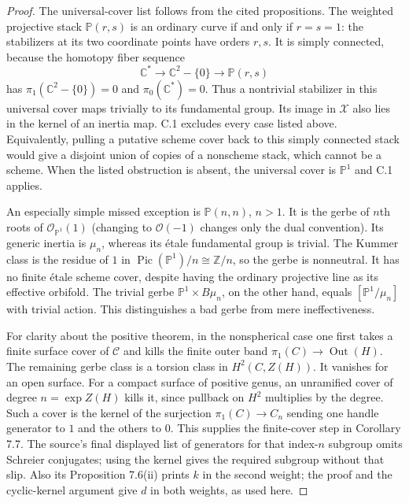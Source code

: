 \begin{proof}
The universal-cover list follows from the cited propositions.
The weighted projective stack $\mathbb P(r,s)$ is an ordinary
curve if and only if $r=s=1$: the stabilizers at its two coordinate
points have orders $r,s$. It is simply connected, because the
homotopy fiber sequence
\[
 \mathbb C^*\longrightarrow\mathbb C^2-\{0\}
          \longrightarrow\mathbb P(r,s)
\]
has $\pi_1(\mathbb C^2-\{0\})=0$ and
$\pi_0(\mathbb C^*)=0$. Thus a nontrivial stabilizer in this
universal cover maps trivially to its fundamental group. Its
image in $\mathcal X$ also lies in the kernel of an inertia map.
C.1 excludes every case listed above. Equivalently, pulling a
putative scheme cover back to this simply connected stack would
give a disjoint union of copies of a nonscheme stack, which cannot
be a scheme. When the listed obstruction is absent, the universal
cover is $\mathbb P^1$ and C.1 applies.

An especially simple missed exception is
$\mathbb P(n,n)$, $n>1$. It is the gerbe of $n$th roots of
$\mathcal O_{\mathbb P^1}(1)$ (changing to $\mathcal O(-1)$
changes only the dual convention). Its generic inertia is
$\mu_n$, whereas its \'etale fundamental group is trivial.
The Kummer class is the residue of $1$ in
$\operatorname{Pic}(\mathbb P^1)/n\cong\mathbb Z/n$,
so the gerbe is nonneutral. It has no finite \'etale scheme cover,
despite having the ordinary projective line as its effective
orbifold. The trivial gerbe $\mathbb P^1\times B\mu_n$, on the
other hand, equals $[\mathbb P^1/\mu_n]$ with trivial action.
This distinguishes a bad gerbe from mere ineffectiveness.

For clarity about the positive theorem, in the nonspherical case
one first takes a finite surface cover of $\mathcal C$ and kills
the finite outer band $\pi_1(C)\to\operatorname{Out}(H)$.
The remaining gerbe class is a torsion class in
$H^2(C,Z(H))$. It vanishes for an open surface. For a compact
surface of positive genus, an unramified cover of degree
$n=\operatorname{exp}Z(H)$ kills it, since pullback on
$H^2$ multiplies by the degree. Such a cover is the kernel of
the surjection $\pi_1(C)\to C_n$ sending one handle generator
to $1$ and the others to $0$. This supplies the finite-cover
step in Corollary 7.7. The source's final displayed list of
generators for that index-$n$ subgroup omits Schreier conjugates;
using the kernel gives the required subgroup without that slip.
Also its Proposition 7.6(ii) prints $k$ in the second weight;
the proof and the cyclic-kernel argument give $d$ in both weights,
as used here.
\end{proof}

